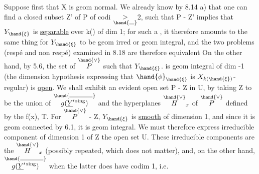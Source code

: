 

Suppose first that X is geom normal. We already know by 8.14 a) that
one can find a closed subset Z' of P of codi $\underset{\hand{\rule{0.7em}{0.35pt}}}{>}$2, such that
\hand{$\xi\in$} P - Z' implies that $Y_{\hand{\xi}}$ is \uline{separable} over k(\hand{$\xi$}) of dim 1; for
such a \hand{$\xi$}, it therefore amounts to the same thing for $Y_{\hand{\xi}}$ to be geom irred or geom
integral, and the two problems (respé and non respé) examined in
8.18 are therefore equivalent On the other hand, by 5.6, the set
 of \hand{$\xi\in$} $\overset{\hand{\vee}}{P}$ such that $Y_{\hand{\xi}}$. is geom integral of dim -1 (the dimension
hypothesis expressing that $\hand{\phi}_{\hand{\xi}}$ is $X_{k(\hand{\xi})}$-regular) is \uline{open}.
We shall exhibit an evident  open set P - Z  in U,
by taking Z to be the union of $\overset{\hand{\rule{3.3em}{0.35pt}}}{g(\underline{Y}'^{\,\mathrm{sing}})}$ and the hyperplanes $\overset{\hand{\vee}}{H}_x$
of $\overset{\hand{\vee}}{P}$ defined by the f(x),  T.  For \hand{$\xi\in$} $\overset{\hand{\vee}}{P}$ - Z, $Y_{\hand{\xi}}$ is \uline{smooth}
of dimension 1, and since it is geom connected by 6.1, it is geom
integral. We must therefore express   irreducible component
of dimension 1 of Z  the open set U. These irreducible
components are the $\overset{\hand{\vee}}{H}_x$ (possibly repeated, which does not matter), and,
on the other hand, $\overset{\hand{\rule{3.3em}{0.35pt}}}{g(\underline{Y}'^{\,\mathrm{sing}})}$ when the latter does have codim 1, i.e.
